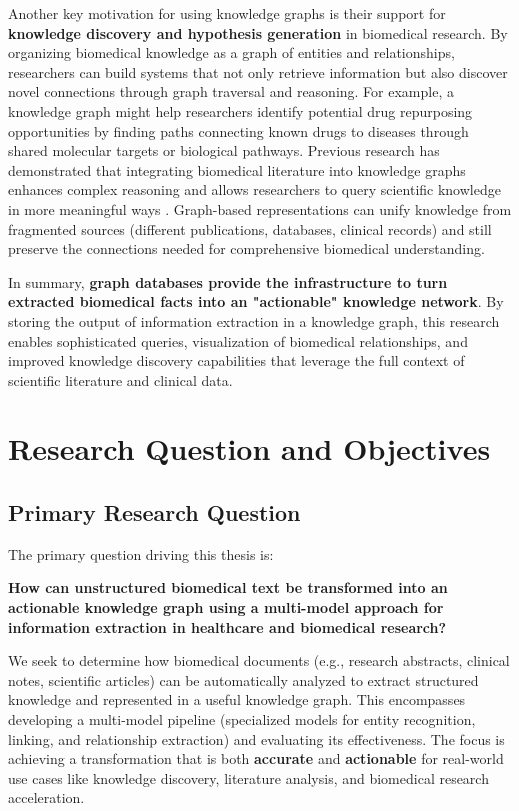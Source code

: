 Another key motivation for using knowledge graphs is their support for \textbf{knowledge discovery and hypothesis generation} in biomedical research. By organizing biomedical knowledge as a graph of entities and relationships, researchers can build systems that not only retrieve information but also discover novel connections through graph traversal and reasoning. For example, a knowledge graph might help researchers identify potential drug repurposing opportunities by finding paths connecting known drugs to diseases through shared molecular targets or biological pathways. Previous research has demonstrated that integrating biomedical literature into knowledge graphs enhances complex reasoning and allows researchers to query scientific knowledge in more meaningful ways \parencite{Rotmensch2017}. Graph-based representations can unify knowledge from fragmented sources (different publications, databases, clinical records) and still preserve the connections needed for comprehensive biomedical understanding.

In summary, \textbf{graph databases provide the infrastructure to turn extracted biomedical facts into an "actionable" knowledge network}. By storing the output of information extraction in a knowledge graph, this research enables sophisticated queries, visualization of biomedical relationships, and improved knowledge discovery capabilities that leverage the full context of scientific literature and clinical data.


\section{Research Question and Objectives}

\subsection{Primary Research Question}

The primary question driving this thesis is:

\textbf{How can unstructured biomedical text be transformed into an actionable knowledge graph using a multi-model approach for information extraction in healthcare and biomedical research?}

We seek to determine how biomedical documents (e.g., research abstracts, clinical notes, scientific articles) can be automatically analyzed to extract structured knowledge and represented in a useful knowledge graph. This encompasses developing a multi-model pipeline (specialized models for entity recognition, linking, and relationship extraction) and evaluating its effectiveness. The focus is achieving a transformation that is both \textbf{accurate} and \textbf{actionable} for real-world use cases like knowledge discovery, literature analysis, and biomedical research acceleration.

